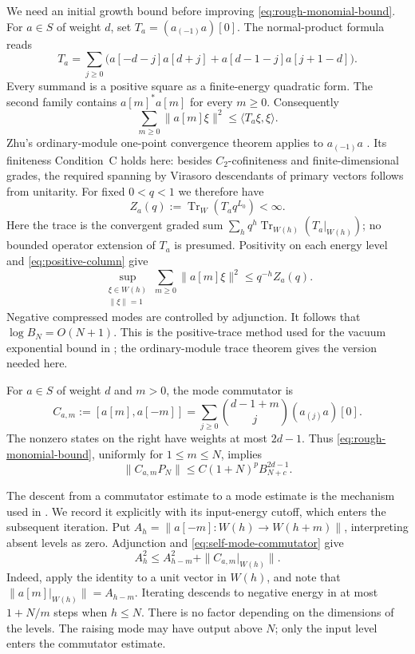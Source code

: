 We need an initial growth bound before improving
\eqref{eq:rough-monomial-bound}.  For $a\in S$ of weight $d$, set
$T_a=(a_{(-1)}a)[0]$.  The normal-product formula reads
\begin{equation}\label{eq:positive-normal-product}
 T_a=\sum_{j\geq0}
 \bigl(a[-d-j]a[d+j]+a[d-1-j]a[j+1-d]\bigr).
\end{equation}
Every summand is a positive square as a finite-energy quadratic form.
The second family contains $a[m]^*a[m]$ for every $m\geq0$.
Consequently
\begin{equation}\label{eq:positive-column}
 \sum_{m\geq0}\|a[m]\xi\|^2
 \leq \langle T_a\xi,\xi\rangle.
\end{equation}
Zhu's ordinary-module one-point convergence theorem applies to
$a_{(-1)}a$ \cite[Sections~4.3--4.4 and Theorem~4.4.1]{Zhu}.  Its finiteness
Condition~C holds here: besides $C_2$-cofiniteness and finite-dimensional
grades, the required spanning by Virasoro descendants of primary
vectors follows from unitarity.  For fixed $0<q<1$ we therefore have
\[
 Z_a(q):=\operatorname{Tr}_W(T_aq^{L_0})<\infty.
\]
Here the trace is the convergent graded sum
$\sum_h q^h\operatorname{Tr}_{W(h)}(T_a|_{W(h)})$; no bounded
operator extension of $T_a$ is presumed.
Positivity on each energy level and \eqref{eq:positive-column} give
\[
 \sup_{\substack{\xi\in W(h)\\\|\xi\|=1}}
       \sum_{m\geq0}\|a[m]\xi\|^2
 \leq q^{-h}Z_a(q).
\]
Negative compressed modes are controlled by adjunction.  It follows
that $\log B_N=O(N+1)$.  This is the positive-trace method used for the
vacuum exponential bound in
\cite[Lemma~3.5 and Proposition~3.17]{CarpiTomassini}; the ordinary-module
trace theorem gives the version needed here.

For $a\in S$ of weight $d$ and $m>0$, the mode commutator is
\begin{equation}\label{eq:self-mode-commutator}
 C_{a,m}:=[a[m],a[-m]]
   =\sum_{j\geq0}\binom{d-1+m}{j}(a_{(j)}a)[0].
\end{equation}
The nonzero states on the right have weights at most $2d-1$.
Thus \eqref{eq:rough-monomial-bound}, uniformly for $1\leq m\leq N$,
implies
\begin{equation}\label{eq:rough-commutator}
 \|C_{a,m}P_N\|
 \leq C(1+N)^p B_{N+c}^{2d-1}.
\end{equation}

The descent from a commutator estimate to a mode estimate is the
mechanism used in \cite[Proposition~3.3]{CTW}. We record it explicitly
with its input-energy cutoff, which enters the subsequent iteration. Put
$A_h=\|a[-m]:W(h)\longrightarrow W(h+m)\|$, interpreting absent
levels as zero.  Adjunction and \eqref{eq:self-mode-commutator} give
\begin{equation}\label{eq:mode-norm-descent}
 A_h^2\leq A_{h-m}^2+\|C_{a,m}|_{W(h)}\|.
\end{equation}
Indeed, apply the identity to a unit vector in $W(h)$, and note that
$\|a[m]|_{W(h)}\|=A_{h-m}$.  Iterating descends to negative energy in
at most $1+N/m$ steps when $h\leq N$.  There is no factor depending on
the dimensions of the levels.  The raising mode may have output above
$N$; only the input level enters the commutator estimate.

